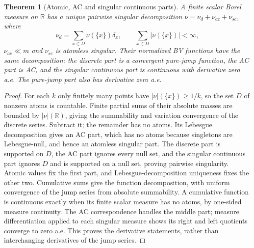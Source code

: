 \documentclass[11pt,oneside,openany]{book}
\newtheorem{theorem}{Theorem}[chapter]
\theoremstyle{definition}
\theoremstyle{remark}
\newcommand{\R}{\mathbb R}\newcommand{\C}{\mathbb C}
\newcommand{\family}[1]{}
\begin{document}
\begin{theorem}[Atomic, AC and singular continuous parts]\family{D11.12.stieltjes_three_parts}\label{d11:12:stieltjes-three-parts}
A finite scalar Borel measure on $\R$ has a unique pairwise singular
decomposition $\nu=\nu_d+\nu_{ac}+\nu_{sc}$, where
\[
 \nu_d=\sum_{x\in D}\nu(\{x\})\delta_x,\qquad
 \sum_{x\in D}|\nu(\{x\})|<\infty,
\]
$\nu_{ac}\ll m$ and $\nu_{sc}$ is atomless singular. Their normalized
BV functions have the same decomposition: the discrete part is a
convergent pure-jump function, the AC part is AC, and the singular
continuous part is continuous with derivative zero a.e. The pure-jump
part also has derivative zero a.e.
\end{theorem}
\begin{proof}
For each $k$ only finitely many points have $|\nu|(\{x\})\geq1/k$,
so the set $D$ of nonzero atoms is countable. Finite partial sums of their
absolute masses are bounded by $|\nu|(\R)$, giving the summability and
variation convergence of the discrete series. Subtract it; the remainder
has no atoms. Its Lebesgue decomposition gives an AC part, which has no
atoms because singletons are Lebesgue-null, and hence an atomless singular
part. The discrete part is supported on $D$, the AC part ignores every
null set, and the singular continuous part ignores $D$ and is supported
on a null set, proving pairwise singularity. Atomic values fix the first
part, and Lebesgue-decomposition uniqueness fixes the other two.
Cumulative sums give the function decomposition, with uniform convergence
of the jump series from absolute summability. A cumulative function is
continuous exactly when its finite scalar measure has no atoms, by
one-sided measure continuity. The AC correspondence handles the middle
part; measure differentiation applied to each singular measure shows its
right and left quotients converge to zero a.e. This proves the derivative
statements, rather than interchanging derivatives of the jump series.
\end{proof}
\end{document}
